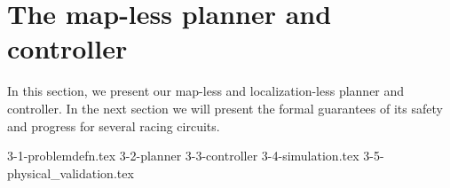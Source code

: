\section{The map-less planner and controller}
In this section, we present our map-less and localization-less planner and controller.
%
In the next section we will present the formal guarantees of its safety and progress for several racing circuits.

{3-1-problemdefn.tex}
{3-2-planner}
{3-3-controller}
{3-4-simulation.tex}
{3-5-physical_validation.tex}